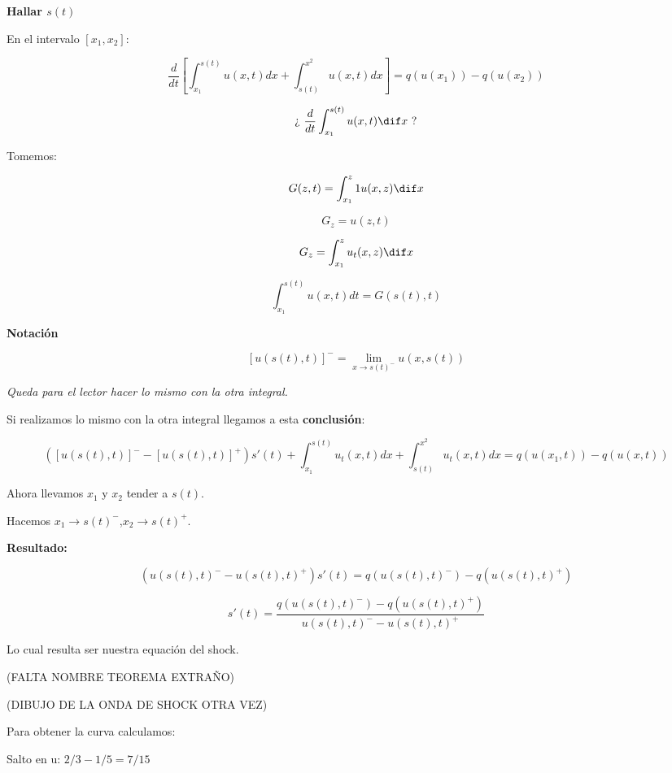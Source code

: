 		\textbf{Hallar $s(t)$}

		\begin{figure}[hbtp]
			\centering
			\caption{}
			\label{fig:discontinuidadAtasco}
		\end{figure}



		En el intervalo $[x_1,x_2]$:

		$$\frac{d}{dt} \left[ \int^{s(t)}_{x_1} u(x,t) dx + \int^{x^2}_{s(t)} u(x,t) dx \right] = q(u(x_1)) - q(u(x_2))$$


		$$ \text{¿ } \frac{d}{dt} \int^{s(t)}_{x_1} u(x,t) \dif x \text{ ?} $$

		Tomemos:

		$$G(z,t) = \int^z_{x_1}1 u(x,z) \dif x $$

		$$G_z = u(z,t) $$

		$$G_z = \int^{z}_{x_1} u_t(x,z) \dif x $$

		$$\int^{s(t)}_{x_1} u(x,t) dt = G(s(t),t)$$


		\textbf{Notación}

		$$[u(s(t),t)]^{-} = \lim_{x \to s(t)^{-}} u(x, s(t)) $$

		\textit{Queda para el lector hacer lo mismo con la otra integral.}

		Si realizamos lo mismo con la otra integral llegamos a esta \textbf{conclusión}:

		$$([u(s(t),t)]^{-} - [u(s(t),t)]^{+}) s'(t) +  \int^{s(t)}_{x_1} u_t(x,t) dx + \int^{x^2}_{s(t)} u_t(x,t) dx = q(u(x_1,t)) - q(u(x,t)) $$

		Ahora llevamos $x_1$ y $x_2$ tender a $s(t)$.

		Hacemos $x_1 \rightarrow s(t)^{-}$,$x_2 \rightarrow s(t)^{+}$.


		\textbf{Resultado:}

		$$(u(s(t),t)^{-} - u(s(t),t)^{+}) s'(t) = q(u(s(t),t)^{-}) - q(u(s(t),t)^{+})$$

		$$s'(t) = \frac{q(u(s(t),t)^{-}) - q(u(s(t),t)^{+})}{u(s(t),t)^{-} - u(s(t),t)^{+}} $$

		Lo cual resulta ser nuestra equación del shock.

		(FALTA NOMBRE TEOREMA EXTRAÑO)

		(DIBUJO DE LA ONDA DE SHOCK OTRA VEZ)

		Para obtener la curva calculamos:

		Salto en u: $2/3 - 1/5 = 7/15$

